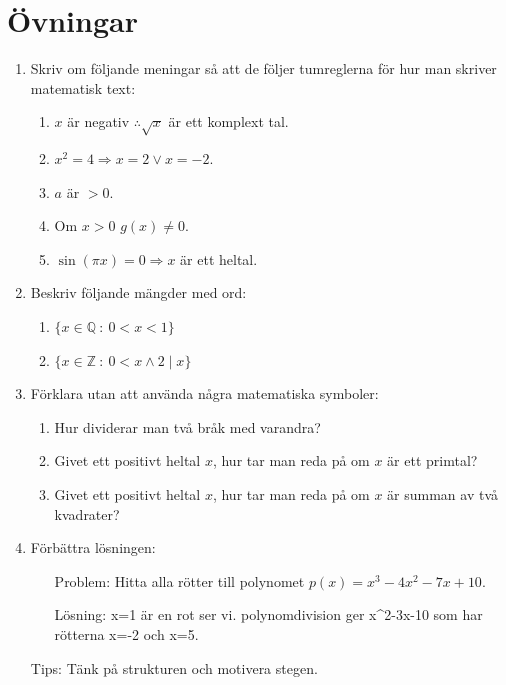 \documentclass[titlepage]{article}
\begin{document}
\section{Övningar}
\begin{enumerate}
    \item Skriv om följande meningar så att de följer tumreglerna för hur man skriver matematisk text:
    \begin{enumerate}[label=(\alph*)]
        \item $x$ är negativ $\therefore \sqrt{x}$ är ett komplext tal.
        \item $x^2 = 4 \Rightarrow x=2 \vee x=-2$.
        \item $a$ är $>0$.
        \item Om $x>0$ $g(x) \neq 0$.
        \item $\sin(\pi x)= 0\Rightarrow x$ är ett heltal. 
    \end{enumerate}
    \item Beskriv följande mängder med ord:
    \begin{enumerate}
        \item $\{x \in \mathbb{Q} \: : \: 0<x<1\}$
        \item $\{x \in \mathbb{Z} \: : \: 0 < x \wedge 2 \mid x\}$
    \end{enumerate}
    \item Förklara utan att använda några matematiska symboler:
    \begin{enumerate}[label=(\alph*)]
        \item Hur dividerar man två bråk med varandra?
        \item Givet ett positivt heltal $x$, hur tar man reda på om $x$ är ett primtal?
        \item Givet ett positivt heltal $x$, hur tar man reda på om $x$ är summan av två kvadrater?
    \end{enumerate}
    \item Förbättra lösningen:
    \begin{enumerate}[leftmargin=20mm]
        \item[Problem:] Hitta alla rötter till polynomet $p(x)=x^3 - 4x^2 - 7x + 10$.
        \item[Lösning:] x=1 är en rot ser vi. polynomdivision ger x\textasciicircum2-3x-10 som har rötterna x=-2 och x=5.
    \end{enumerate}
    Tips: Tänk på strukturen och motivera stegen.
\end{enumerate}




\newpage

\end{document}
